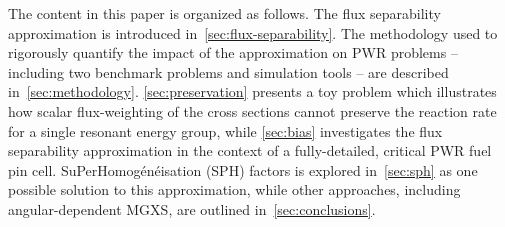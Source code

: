 The content in this paper is organized as follows. The flux separability approximation is introduced in~\autoref{sec:flux-separability}. The methodology used to rigorously quantify the impact of the approximation on PWR problems -- including two benchmark problems and simulation tools -- are described in~\autoref{sec:methodology}. \autoref{sec:preservation} presents a toy problem which illustrates how scalar flux-weighting of the cross sections cannot preserve the reaction rate for a single resonant energy group, while \autoref{sec:bias} investigates the flux separability approximation in the context of a fully-detailed, critical PWR fuel pin cell. SuPerHomog\'{e}n\'{e}isation (SPH) factors is explored in~\autoref{sec:sph} as one possible solution to this approximation, while other approaches, including angular-dependent MGXS, are outlined in~\autoref{sec:conclusions}.